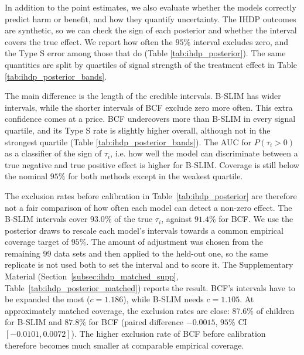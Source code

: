 \documentclass[12pt]{article}
\begin{document}
In addition to the point estimates, we also evaluate whether the models correctly predict harm or benefit, and how they quantify uncertainty. The IHDP outcomes are synthetic, so we can check the sign of each posterior and whether the interval covers the true effect. We report how often the $95\%$ interval excludes zero, and the Type S error among those that do (Table \ref{tab:ihdp_posterior}). The same quantities are split by quartiles of signal strength of the treatment effect in Table \ref{tab:ihdp_posterior_bands}.

The main difference is the length of the credible intervals. B-SLIM has wider intervals, while the shorter intervals of BCF exclude zero more often. This extra confidence comes at a price. BCF undercovers more than B-SLIM in every signal quartile, and its Type S rate is slightly higher overall, although not in the strongest quartile (Table \ref{tab:ihdp_posterior_bands}). The AUC for $P(\tau_i>0)$ as a classifier of the sign of $\tau_i$, i.e. how well the model can discriminate between a true negative and true positive effect is higher for B-SLIM. Coverage is still below the nominal $95\%$ for both methods except in the weakest quartile.

The exclusion rates before calibration in Table~\ref{tab:ihdp_posterior} are therefore not a fair comparison of how often each model can detect a non-zero effect. The B-SLIM intervals cover $93.0\%$ of the true $\tau_i$, against $91.4\%$ for BCF. We use the posterior draws to rescale each model's intervals towards a common empirical coverage target of $95\%$. The amount of adjustment was chosen from the remaining 99 data sets and then applied to the held-out one, so the same replicate is not used both to set the interval and to score it. The Supplementary Material (Section~\ref{subsec:ihdp_matched_supp}, Table~\ref{tab:ihdp_posterior_matched}) reports the result. BCF's intervals have to be expanded the most ($c=1.186$), while B-SLIM needs $c=1.105$. At approximately matched coverage, the exclusion rates are close: $87.6\%$ of children for B-SLIM and $87.8\%$ for BCF (paired difference $-0.0015$, $95\%$ CI $[-0.0101,0.0072]$). The higher exclusion rate of BCF before calibration therefore becomes much smaller at comparable empirical coverage.
\end{document}
